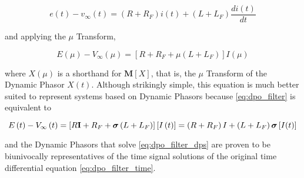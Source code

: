 \begin{equation} e\left(t\right) - v_\infty\left(t\right) = \left(R + R_F\right)i(t) + \left(L + L_F\right) \dfrac{di(t)}{dt} \label{eq:dpo_filter_time} \end{equation}

	\noindent and applying the $\mu$ Transform,

\begin{equation} E\left(\mu\right) - V_\infty\left(\mu\right) = \left[R + R_F + \mu\left(L + L_F\right)\right] I\left(\mu\right) \label{eq:dpo_filter} \end{equation}

	\noindent where $X\left(\mu\right)$ is a shorthand for $\mathbf{M}\left[X\right]$, that is, the $\mu$ Transform of the Dynamic Phasor $X(t)$. Although strikingly simple, this equation is much better suited to represent systems based on Dynamic Phasors because \eqref{eq:dpo_filter} is equivalent to

\begin{equation} E\left(t\right) - V_\infty\left(t\right) = \left[R\mathbf{I} + R_F + \boldsymbol{\sigma}\left(L + L_F\right)\right]\left[I\left(t\right)\right]  = \left(R + R_F\right)I + \left(L + L_F\right)\boldsymbol{\sigma}\left[I(t)\right] \label{eq:dpo_filter_dps} \end{equation}

	\noindent and the Dynamic Phasors that solve \eqref{eq:dpo_filter_dps} are proven to be biunivocally representatives of the time signal solutions of the original time differential equation \eqref{eq:dpo_filter_time}.

